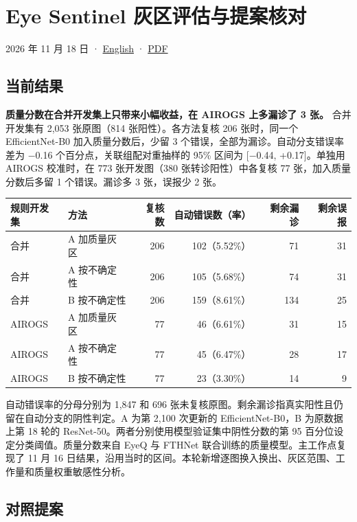 \documentclass[
  10pt,
]{article}
\author{}
\date{}
\newcounter{none} %
\begin{document}
\section{Eye Sentinel
灰区评估与提案核对}\label{eye-sentinel-ux7070ux533aux8bc4ux4f30ux4e0eux63d0ux6848ux6838ux5bf9}

2026 年 11 月 18 日 · \href{gray-zone.en.md}{English} ·
\href{gray-zone.zh.pdf}{PDF}

\subsection{当前结果}\label{ux5f53ux524dux7ed3ux679c}

\textbf{质量分数在合并开发集上只带来小幅收益，在 AIROGS 上多漏诊了 3
张。} 合并开发集有 2,053 张原图（814 张阳性）。各方法复核 206
张时，同一个 EfficientNet-B0 加入质量分数后，少留 3
个错误，全部为漏诊。自动分支错误率差为 −0.16
个百分点，关联组配对重抽样的 95\% 区间为 {[}−0.44, +0.17{]}。单独用
AIROGS 校准时，在 773 张开发图（380 张转诊阳性）中各复核 77
张，加入质量分数后多留 1 个错误。漏诊多 3 张，误报少 2 张。

{\def\LTcaptype{none} %
\begin{longtable}[]{@{}llrrrr@{}}
\toprule\noalign{}
规则开发集 & 方法 & 复核数 & 自动错误数（率） & 剩余漏诊 & 剩余误报 \\
\midrule\noalign{}
\endhead
\bottomrule\noalign{}
\endlastfoot
合并 & A 加质量灰区 & 206 & 102（5.52\%） & 71 & 31 \\
合并 & A 按不确定性 & 206 & 105（5.68\%） & 74 & 31 \\
合并 & B 按不确定性 & 206 & 159（8.61\%） & 134 & 25 \\
AIROGS & A 加质量灰区 & 77 & 46（6.61\%） & 31 & 15 \\
AIROGS & A 按不确定性 & 77 & 45（6.47\%） & 28 & 17 \\
AIROGS & B 按不确定性 & 77 & 23（3.30\%） & 14 & 9 \\
\end{longtable}
}

自动错误率的分母分别为 1,847 和 696
张未复核原图。剩余漏诊指真实阳性且仍留在自动分支的阴性判定。A 为第 2,100
次更新的 EfficientNet-B0，B 为原数据上第 18 轮的
ResNet-50。两者分别使用模型验证集中阴性分数的第 95
百分位设定分类阈值。质量分数来自 EyeQ 与 FTHNet
联合训练的质量模型。主工作点复现了 11 月 16
日结果，沿用当时的区间。本轮新增逐图换入换出、灰区范围、工作量和质量权重敏感性分析。

\subsection{对照提案}\label{ux5bf9ux7167ux63d0ux6848}
\end{document}
